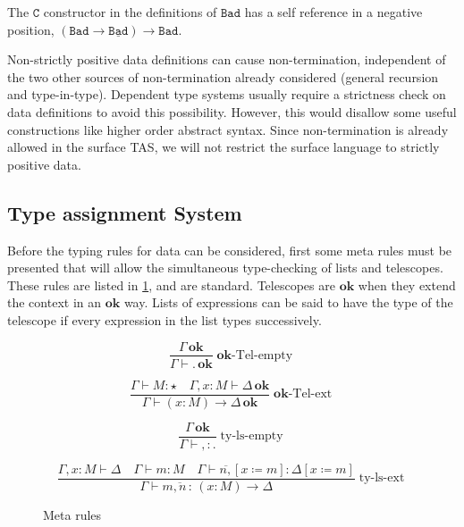 The $\mathtt{C}$ constructor in the definitions of $\mathtt{Bad}$ has a self reference in a negative position, $(\mathtt{Bad}\rightarrow\underline{\mathtt{Bad}})\rightarrow\mathtt{Bad}$. 

Non-strictly positive data definitions can cause non-termination, independent of the two other sources of non-termination already considered (general recursion and type-in-type).
Dependent type systems usually require a strictness check on data definitions to avoid this possibility.
However, this would disallow some useful constructions like higher order abstract syntax.
Since non-termination is already allowed in the surface \ac{TAS}, we will not restrict the surface language to strictly positive data.



\subsection{Type assignment System}

Before the typing rules for data can be considered, first some meta rules must be presented that will allow the simultaneous type-checking of lists and telescopes.
These rules are listed in \ref{fig:surface-data-meta-ty}, and are standard.
Telescopes are $\mathbf{ok}$ when they extend the context in an $\mathbf{ok}$ way.
Lists of expressions can be said to have the type of the telescope if every expression in the list types successively.

\begin{figure}
\[
\frac{\Gamma\,\mathbf{ok}}{\Gamma\vdash.\,\mathbf{ok}}\operatorname{\mathbf{ok}-Tel-empty}
\]

\[
\frac{\Gamma\vdash M:\star\quad\Gamma,x:M\vdash\Delta\,\mathbf{ok}}{\Gamma\vdash\left(x:M\right)\rightarrow\Delta\,\mathbf{ok}}\operatorname{\mathbf{ok}-Tel-ext}
\]

\[
\frac{\Gamma\,\mathbf{ok}}{\Gamma\vdash,:.}\operatorname{ty-ls-empty}
\]

\[
\frac{\Gamma,x:M\vdash\Delta\quad\Gamma\vdash m:M\quad\Gamma\vdash\overline{n,}\left[x\coloneqq m\right]:\Delta\left[x\coloneqq m\right]}{\Gamma\vdash m\overline{,n}\,:\,\left(x:M\right)\rightarrow\Delta}\operatorname{ty-ls-ext}
\]

\caption{Meta rules}
\label{fig:surface-data-meta-ty}
\end{figure}

